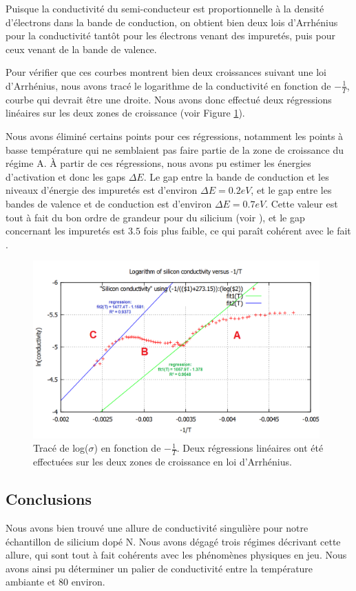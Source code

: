 Puisque la conductivité du semi-conducteur est proportionnelle à la densité d'électrons dans la bande de conduction, on obtient bien deux lois d'Arrhénius pour la conductivité tantôt pour les électrons venant des impuretés, puis pour ceux venant de la bande de valence.

Pour vérifier que ces courbes montrent bien deux croissances suivant une loi d'Arrhénius, nous avons tracé le logarithme de la conductivité en fonction de $-\frac{1}{T}$, courbe qui devrait être une droite. Nous avons donc effectué deux régressions linéaires sur les deux zones de croissance (voir Figure \ref{log}).

Nous avons éliminé certains points pour ces régressions, notamment les points à basse température qui ne semblaient 
pas faire partie de la zone de croissance du régime A. À partir de ces régressions, nous avons pu estimer les énergies 
d'activation et donc les gaps $\Delta E$. Le gap entre la bande de conduction et les niveaux d'énergie des impuretés 
est d'environ $\Delta E = 0.2 eV$, et le gap entre les bandes de valence et de conduction est d'environ $\Delta E = 0.7 eV$. 
Cette valeur est tout à fait du bon ordre de grandeur pour du silicium (voir \cite{kittel_introduction_1976}), et le 
gap concernant les impuretés est $3.5$ fois plus faible, ce qui paraît cohérent avec le fait .

\begin{figure}[ht]
  \begin{center}
		\includegraphics[width=11cm]{./images/Fit_de_log(sigma)_versus_-inverse(T).png}
		\caption{Tracé de log($\sigma$) en fonction de $-\frac{1}{T}$. Deux régressions linéaires ont été effectuées sur les deux zones de croissance en loi d'Arrhénius.}
		\label{log}
	\end{center}
\end{figure}

\subsection{Conclusions}
Nous avons bien trouvé une allure de conductivité singulière pour notre échantillon de silicium dopé N. Nous avons 
dégagé trois régimes décrivant cette allure, qui sont tout à fait cohérents avec les phénomènes physiques en jeu. 
Nous avons ainsi pu déterminer un palier de conductivité entre la température ambiante et 80 \celsius{} environ.
